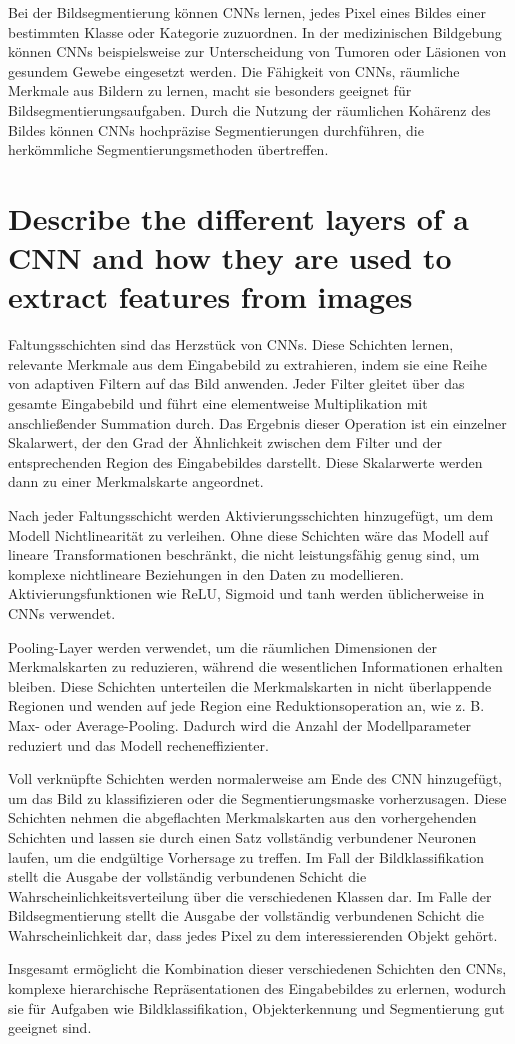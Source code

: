         Bei der Bildsegmentierung können CNNs lernen, jedes Pixel eines Bildes einer bestimmten Klasse oder Kategorie
        zuzuordnen. In der medizinischen Bildgebung können CNNs beispielsweise zur Unterscheidung von Tumoren oder
        Läsionen von gesundem Gewebe eingesetzt werden. Die Fähigkeit von CNNs, räumliche Merkmale aus Bildern zu
        lernen, macht sie besonders geeignet für Bildsegmentierungsaufgaben. Durch die Nutzung der räumlichen Kohärenz
        des Bildes können CNNs hochpräzise Segmentierungen durchführen, die herkömmliche Segmentierungsmethoden
        übertreffen.
    
    

    \section{Describe the different layers of a CNN and how they are used to extract features from images}

        Faltungsschichten sind das Herzstück von CNNs. Diese Schichten lernen, relevante Merkmale aus dem Eingabebild
        zu extrahieren, indem sie eine Reihe von adaptiven Filtern auf das Bild anwenden. Jeder Filter gleitet über
        das gesamte Eingabebild und führt eine elementweise Multiplikation mit anschließender Summation durch. Das
        Ergebnis dieser Operation ist ein einzelner Skalarwert, der den Grad der Ähnlichkeit zwischen dem Filter und
        der entsprechenden Region des Eingabebildes darstellt. Diese Skalarwerte werden dann zu einer Merkmalskarte
        angeordnet.

        Nach jeder Faltungsschicht werden Aktivierungsschichten hinzugefügt, um dem Modell Nichtlinearität zu
        verleihen. Ohne diese Schichten wäre das Modell auf lineare Transformationen beschränkt, die nicht
        leistungsfähig genug sind, um komplexe nichtlineare Beziehungen in den Daten zu modellieren.
        Aktivierungsfunktionen wie ReLU, Sigmoid und tanh werden üblicherweise in CNNs verwendet.
        
        Pooling-Layer werden verwendet, um die räumlichen Dimensionen der Merkmalskarten zu reduzieren, während die
        wesentlichen Informationen erhalten bleiben. Diese Schichten unterteilen die Merkmalskarten in nicht
        überlappende Regionen und wenden auf jede Region eine Reduktionsoperation an, wie z. B. Max- oder
        Average-Pooling. Dadurch wird die Anzahl der Modellparameter reduziert und das Modell recheneffizienter.

        Voll verknüpfte Schichten werden normalerweise am Ende des CNN hinzugefügt, um das Bild zu klassifizieren oder
        die Segmentierungsmaske vorherzusagen. Diese Schichten nehmen die abgeflachten Merkmalskarten aus den
        vorhergehenden Schichten und lassen sie durch einen Satz vollständig verbundener Neuronen laufen, um die
        endgültige Vorhersage zu treffen. Im Fall der Bildklassifikation stellt die Ausgabe der vollständig
        verbundenen Schicht die Wahrscheinlichkeitsverteilung über die verschiedenen Klassen dar. Im Falle der
        Bildsegmentierung stellt die Ausgabe der vollständig verbundenen Schicht die Wahrscheinlichkeit dar, dass
        jedes Pixel zu dem interessierenden Objekt gehört.

        Insgesamt ermöglicht die Kombination dieser verschiedenen Schichten den CNNs, komplexe hierarchische
        Repräsentationen des Eingabebildes zu erlernen, wodurch sie für Aufgaben wie Bildklassifikation,
        Objekterkennung und Segmentierung gut geeignet sind.
    